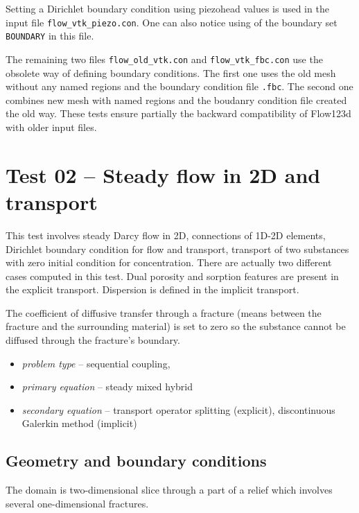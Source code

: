 Setting a Dirichlet boundary condition using piezohead values is used in the input file \verb'flow_vtk_piezo.con'.
One can also notice using of the boundary set \verb'BOUNDARY' in this file.

The remaining two files \verb'flow_old_vtk.con' and \verb'flow_vtk_fbc.con' use the obsolete way of defining boundary conditions.
The first one uses the old mesh without any named regions and the boundary condition file \verb'.fbc'. The second one combines
new mesh with named regions and the boudanry condition file created the old way. These tests ensure partially the backward 
compatibility of Flow123d with older input files.


\section{Test 02 -- Steady flow in 2D and transport}
\label{sec:test02}
This test involves steady Darcy flow in 2D, connections of 1D-2D elements, Dirichlet boundary condition for flow and transport, 
transport of two substances with zero initial condition for concentration. There are actually two different cases computed in this test. 
Dual porosity and sorption features are present in the explicit transport. Dispersion is defined in the implicit transport.

The coefficient of diffusive transfer through a fracture (means between the fracture and the surrounding material) is set to 
zero so the substance cannot be diffused through the fracture's boundary.

  \begin{itemize} 
    \item \emph{problem type} -- sequential coupling, 
    \item \emph{primary equation} -- steady mixed hybrid
    \item \emph{secondary equation} -- transport operator splitting (explicit), discontinuous Galerkin method (implicit)
  \end{itemize}

\subsection*{Geometry and boundary conditions}
The domain is two-dimensional slice through a part of a relief which involves several one-dimensional fractures.

